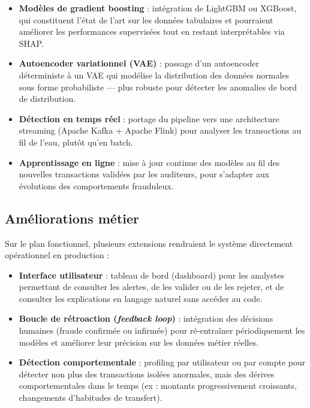 \begin{itemize}
  \item \textbf{Modèles de gradient boosting} : intégration de LightGBM ou XGBoost,
    qui constituent l'état de l'art sur les données tabulaires et pourraient améliorer
    les performances supervisées tout en restant interprétables via SHAP.
  \item \textbf{Autoencoder variationnel (VAE)} : passage d'un autoencoder déterministe
    à un VAE qui modélise la distribution des données normales sous forme probabiliste
    --- plus robuste pour détecter les anomalies de bord de distribution.
  \item \textbf{Détection en temps réel} : portage du pipeline vers une architecture
    streaming (Apache Kafka + Apache Flink) pour analyser les transactions au fil de
    l'eau, plutôt qu'en batch.
  \item \textbf{Apprentissage en ligne} : mise à jour continue des modèles au fil des
    nouvelles transactions validées par les auditeurs, pour s'adapter aux évolutions
    des comportements frauduleux.
\end{itemize}

\subsection{Améliorations métier}

Sur le plan fonctionnel, plusieurs extensions rendraient le système directement opérationnel
en production :

\begin{itemize}
  \item \textbf{Interface utilisateur} : tableau de bord (dashboard) pour les analystes
    permettant de consulter les alertes, de les valider ou de les rejeter, et de consulter
    les explications en langage naturel sans accéder au code.
  \item \textbf{Boucle de rétroaction (\textit{feedback loop})} : intégration des
    décisions humaines (fraude confirmée ou infirmée) pour ré-entraîner périodiquement
    les modèles et améliorer leur précision sur les données métier réelles.
  \item \textbf{Détection comportementale} : profiling par utilisateur ou par compte
    pour détecter non plus des transactions isolées anormales, mais des dérives
    comportementales dans le temps (ex : montants progressivement croissants, changements
    d'habitudes de transfert).
\end{itemize}

